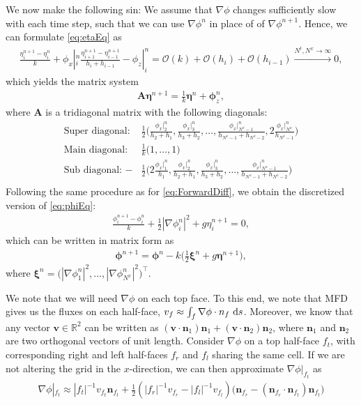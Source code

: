 \documentclass[11pt]{article}
\begin{document}
We now make the following sin: We assume that $\nabla \phi$ changes sufficiently slow with each time step, such that we can use $\nabla \phi^n$
in place of of $\nabla \phi^{n+1}$. Hence, we can formulate \eqref{eq:etaEq} as
\begin{align*}
    \frac{\eta_i^{n+1} - \eta_i^n}{k} + \phi_x|_i^{n} \frac{\eta_{i+1}^{n+1}-\eta_{i-1}^{n+1}}{h_i + h_{i-1}} - \phi_z|_i^n
                       = \mathcal{O}(k) + \mathcal{O}(h_i) + \mathcal{O}(h_{i-1}) \xrightarrow{N^t, N^x \rightarrow \infty} 0,
\end{align*}
which yields the matrix system
\begin{align}
    \label{eq:etan+1}
    \bm{A} \bm{\eta}^{n+1} = \frac{1}{k}\bm{\eta}^n + \bm{\phi}_z^n,
\end{align}
where $\bm{A}$ is a tridiagonal matrix with the following diagonals:
\begin{align*}
    \text{Super diagonal: } &\frac{1}{2} \bigg(\frac{\phi_x|_2^{n}}{h_2 + h_1}, \frac{\phi_x|_3^{n}}{h_3+h_2},
                                        \dots, \frac{\phi_x|_{N^x-1}^n}{h_{N^x-1} + h_{N^x-2}}, 2\frac{\phi_x|_{N^x}^n}{h_{N^x-1}}\bigg) \\
    \text{Main diagonal: }  &\frac{1}{k}  \Big(1, \dots, 1\Big)                                        \\
    \text{Sub diagonal: }  -&\frac{1}{2} \bigg(2\frac{\phi_x|_1^{n}}{h_1}, \frac{\phi_x|_2^{n}}{h_2+h_1}, \frac{\phi_x|_3^n}{h_3 + h_2},
                                        \dots, \frac{\phi_x|_{N^x-1}^n}{h_{N^x-1} + h_{N^x-2}}\bigg) \\
\end{align*}
Following the same procedure as for \eqref{eq:ForwardDiff}, we obtain the discretized version of \eqref{eq:phiEq}:
\begin{align*}
    \frac{\phi_i^{n+1}-\phi_i^n}{k} + \frac{1}{2}|\nabla \phi_i^n|^2 + g \eta_i^{n+1} = 0,
\end{align*}
which can be written in matrix form as
\begin{align}
    \label{eq:phin+1}
    \bm{\phi}^{n+1} = \bm{\phi}^n - k\bigg(\frac{1}{2}\bm{\xi}^n + g \bm{\eta}^{n+1}\bigg),
\end{align}
where $\bm{\xi}^n = \Big(|\nabla \phi_1^n|^2, \dots,  |\nabla \phi_{N^x}^n|^2\bigg)^\top$.

We note that we will need $\nabla \phi$ on each top face. To this end, we note that MFD gives us the fluxes on each half-face, $v_{f} \approx \int_{f} \nabla \phi \cdot n_{f} \, \operatorname{d}\! s$.
Moreover, we know that any vector $\bm{v} \in \mathbb{R}^2$ can be written as $(\bm{v}\cdot\bm{n}_1) \bm{n}_1 + (\bm{v}\cdot\bm{n}_2) \bm{n}_2$,
where $\bm{n}_1$ and $\bm{n}_2$ are two orthogonal vectors of unit length.
Consider $\nabla \phi$ on a top half-face $f_t$, with corresponding right and left half-faces $f_r$ and $f_l$ sharing the same cell.
If we are not altering the grid in the $x$-direction, we can then approximate $\nabla \phi|_{f_t}$ as
\begin{align*}
    \nabla \phi|_{f_t} \approx |f_t|^{-1} v_{f_t} \bm{n}_{f_t} + \frac{1}{2}(|f_r|^{-1}v_{f_r}-|f_l|^{-1}v_{f_l})\big(\bm{n}_{f_r} - (\bm{n}_{f_r} \cdot \bm{n}_{f_t})\bm{n}_{f_t}\big)
\end{align*}
\end{document}
